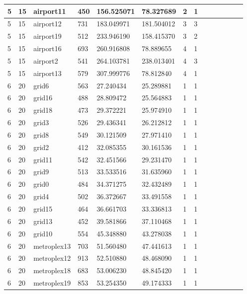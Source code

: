 \documentclass[../thesis.tex]{subfiles}
\begin{document}
\begin{table}[!ht]
\begin{tabularx}{\textwidth}{|X|X|X|X|X|X|X|X|X|X|X|X|X|X|}
        5 & 15 & airport11 & 450 & 156.525071 & 78.327689 & 2 & 1 \\ \hline
        5 & 15 & airport12 & 731 & 183.049971 & 181.504012 & 3 & 3 \\ \hline
        5 & 15 & airport19 & 512 & 233.946190 & 158.415370 & 3 & 2 \\ \hline
        5 & 15 & airport16 & 693 & 260.916808 & 78.889655 & 4 & 1 \\ \hline
        5 & 15 & airport2 & 541 & 264.103781 & 238.013401 & 4 & 3 \\ \hline
        5 & 15 & airport13 & 579 & 307.999776 & 78.812840 & 4 & 1 \\ \hline
        6 & 20 & grid6 & 563 & 27.240434 & 25.289881 & 1 & 1 \\ \hline
        6 & 20 & grid16 & 488 & 28.809472 & 25.564883 & 1 & 1 \\ \hline
        6 & 20 & grid18 & 473 & 29.372221 & 25.974910 & 1 & 1 \\ \hline
        6 & 20 & grid3 & 526 & 29.436341 & 26.212812 & 1 & 1 \\ \hline
        6 & 20 & grid8 & 549 & 30.121509 & 27.971410 & 1 & 1 \\ \hline
        6 & 20 & grid2 & 412 & 32.085355 & 30.161536 & 1 & 1 \\ \hline
        6 & 20 & grid11 & 542 & 32.451566 & 29.231470 & 1 & 1 \\ \hline
        6 & 20 & grid9 & 513 & 33.533516 & 31.635960 & 1 & 1 \\ \hline
        6 & 20 & grid0 & 484 & 34.371275 & 32.432489 & 1 & 1 \\ \hline
        6 & 20 & grid4 & 502 & 36.372667 & 33.491558 & 1 & 1 \\ \hline
        6 & 20 & grid15 & 464 & 36.661703 & 33.336813 & 1 & 1 \\ \hline
        6 & 20 & grid13 & 452 & 39.581866 & 37.110468 & 1 & 1 \\ \hline
        6 & 20 & grid10 & 554 & 45.348880 & 43.278038 & 1 & 1 \\ \hline
        6 & 20 & metroplex13 & 703 & 51.560480 & 47.441613 & 1 & 1 \\ \hline
        6 & 20 & metroplex12 & 913 & 52.510880 & 48.468090 & 1 & 1 \\ \hline
        6 & 20 & metroplex18 & 683 & 53.006230 & 48.845420 & 1 & 1 \\ \hline
        6 & 20 & metroplex19 & 853 & 53.254350 & 49.174333 & 1 & 1 \\ \hline

\end{tabularx}
\end{table}
\end{document}
